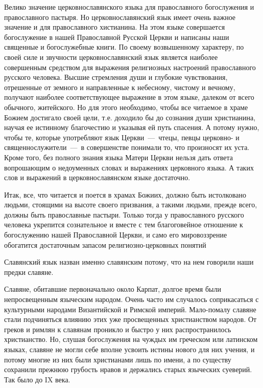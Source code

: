 \documentclass[11pt,a4paper,oneside]{memoir}
\begin{document}
    Велико значение церковнославянского языка для православного богослужения и православного пастыря. Но церковнославянский язык имеет очень важное значение и для православного хистианина. На этом языке совершается богослужение в нашей Православной Русской Церкви и написаны наши священные и богослужебные книги. По своему возвышенному характеру, по своей силе и звучности церковнославянский язык является наиболее совершенным средством для выражения религиозных настроений православного русского человека. Высшие стремления души и глубокие чувствования, отрешенные от земного и направленные к небесному, чистому и вечному, получают наиболее соответствующее выражение в этом языке, далеком от всего обычного, житейского. Но для этого необходимо, чтобы все читаемое в храме Божием достигало своей цели, т.е. доходило бы до сознания души христианина, научая ее истинному благочестию и указывая ей путь спасения. А потому нужно, чтобы те, которые употребляют язык Церкви~---~чтецы, певцы церковно- и священнослужители~---~в совершенстве понимали то, что произносят их уста. Кроме того, без полного знания языка Матери Церкви нельзя дать ответа вопрошающим о недоуменных словах и выражениях церковного языка. А таких слов и выражений в церковнославянском языке достаточно.
    
    Итак, все, что читается и поется в храмах Божиих, должно быть истолковано людьми, стоящими на высоте своего призвания, а такими людьми, прежде всего, должны быть православные пастыри. Только тогда у православного русского человека укрепится сознательное и вместе с тем благоговейное отношение к богослужению нашей Православной Церкви, и само его мировоззрение обогатится достаточным запасом религиозно-церковных понятий
    
    Славянский язык назван именно славянским потому, что на нем говорили наши предки славяне.
    
    Славяне, обитавшие первоначально около Карпат, долгое время были непросвещенным языческим народом. Очень часто им случалось соприкасаться с культурными народами Византийской и Римской империй. Мало-помалу славяне стали подчиняться влиянию этих уже просвещенных христианством народов. От греков и римлян к славянам проникло и быстро у них распространилось христианство. Но, слушая богослужения на чуждых им греческом или латинском языках, славяне не могли себе вполне усвоить истины нового для них учения, и потому многие из них были христианами лишь по имени, а по существу сохранили прежнюю грубость нравов и держались старых языческих суеверий. Так было до IX века.
    
\end{document}
